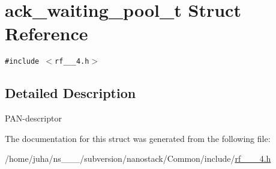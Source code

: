 \hypertarget{structack__waiting__pool__t}{
\section{ack\_\-waiting\_\-pool\_\-t Struct Reference}
\label{structack__waiting__pool__t}
}
{\tt \#include $<$rf\_\_\_\-4.h$>$}



\subsection{Detailed Description}
PAN-descriptor 



The documentation for this struct was generated from the following file:\begin{CompactItemize}
\item 
/home/juha/ns\_\_\_/subversion/nanostack/Common/include/\hyperlink{rf__802__15__4_8h}{rf\_\_\_\-4.h}\end{CompactItemize}

